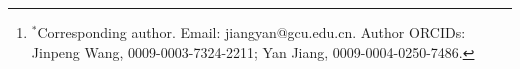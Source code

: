 \author{JINPENG WANG$\dag$ and YAN JIANG$^{\ast}\dag$\thanks{$^\ast$Corresponding author. Email: jiangyan@gcu.edu.cn. Author ORCIDs: Jinpeng Wang, 0009-0003-7324-2211; Yan Jiang, 0009-0004-0250-7486.}}
